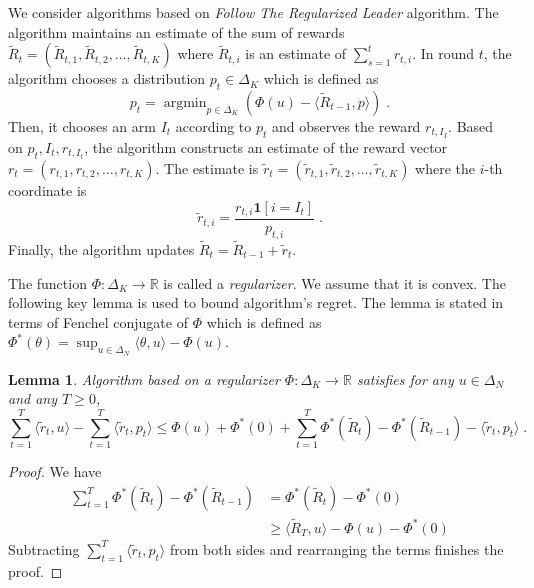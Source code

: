 \documentclass[12pt]{article}
\newtheorem{lemma}{Lemma}
\newcommand{\R}{\mathbb{R}}
\newcommand{\indicator}{\mathbf{1}}
\DeclareMathOperator{\argmin}{argmin}
\begin{document}
We consider algorithms based on \emph{Follow The Regularized Leader} algorithm.
The algorithm maintains an estimate of the sum of rewards $\widetilde R_t =
(\widetilde R_{t,1}, \widetilde R_{t,2}, \dots, \widetilde R_{t,K})$ where $\widetilde R_{t,i}$
is an estimate of $\sum_{s=1}^t r_{t,i}$.
In round $t$, the algorithm chooses a distribution $p_t \in \Delta_K$ which
is defined as
$$
p_t = \argmin_{p \in \Delta_K} \left( \Phi(u) - \langle \widetilde R_{t-1}, p \rangle \right) \; .
$$
Then, it chooses an arm $I_t$ according to $p_t$ and observes the reward $r_{t,I_I}$.
Based on $p_t, I_t, r_{t,I_t}$, the algorithm constructs an estimate of the reward vector $r_t = (r_{t,1}, r_{t,2}, \dots, r_{t,K})$.
The estimate is $\widetilde r_t = (\widetilde r_{t,1}, \widetilde r_{t,2}, \dots, \widetilde r_{t,K})$
where the $i$-th coordinate is
$$
\widetilde r_{t,i} = \frac{r_{t,i} \indicator[i=I_t]}{p_{t,i}}  \; .
$$
Finally, the algorithm updates $\widetilde R_t = \widetilde R_{t-1} + \widetilde r_t$.

The function $\Phi:\Delta_K \to \R$ is called a \emph{regularizer}. We assume
that it is convex.  The following key lemma is used to bound algorithm's
regret. The lemma is stated in terms of Fenchel conjugate of $\Phi$ which is
defined as $\Phi^*(\theta) = \sup_{u \in \Delta_N} \langle \theta, u \rangle -
\Phi(u)$.

\begin{lemma}
\label{lemma:ftrl-regret}
Algorithm based on a regularizer $\Phi:\Delta_K \to \R$ satisfies
for any $u \in \Delta_N$ and any $T \ge 0$,
\begin{equation}
\label{equation:ftrl-regret}
\sum_{t=1}^T \langle \widetilde r_t, u \rangle - \sum_{t=1}^T \langle \widetilde r_t, p_t \rangle
\le \Phi(u) + \Phi^*(0) + \sum_{t=1}^T \Phi^*\left(\widetilde R_t\right) - \Phi^*\left(\widetilde R_{t-1}\right) - \langle \widetilde r_t, p_t \rangle \; .
\end{equation}
\end{lemma}

\begin{proof}
We have
\begin{align*}
\sum_{t=1}^T \Phi^*\left(\widetilde R_t\right) - \Phi^*\left(\widetilde R_{t-1}\right)
& = \Phi^*\left(\widetilde R_t \right) - \Phi^*(0) \\
& \ge \langle \widetilde R_T, u \rangle -  \Phi(u) - \Phi^*(0)
\end{align*}
Subtracting $\sum_{t=1}^T \langle \widetilde r_t, p_t \rangle$ from both sides
and rearranging the terms finishes the proof.
\end{proof}
\end{document}
